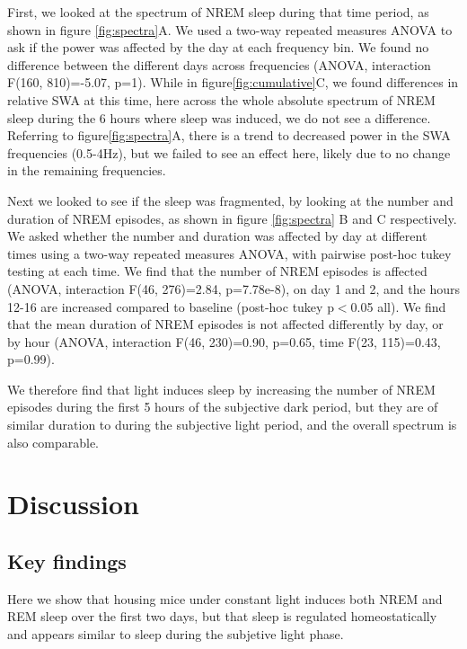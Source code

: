 First, we looked at the spectrum of NREM sleep during that time period, as
shown in figure \ref{fig:spectra}A.
We used a two-way repeated measures ANOVA to ask if the power was affected by
the day at each frequency bin.
We found no difference between the different days across frequencies (ANOVA,
interaction F(160, 810)=-5.07, p=1).
While in figure\ref{fig:cumulative}C, we found differences in relative
SWA at this time,
here across the whole absolute spectrum of NREM sleep during 
the 6 hours where sleep was induced, we do not see a difference.
Referring to figure\ref{fig:spectra}A, there is a trend to decreased
power in the SWA frequencies (0.5-4Hz), 
but we failed to see an effect here, likely due to no change in 
the remaining frequencies.

Next we looked to see if the sleep was fragmented, by looking at the number
and duration of NREM episodes, as shown in figure
\ref{fig:spectra} B and C respectively.
We asked whether the number and duration was affected by day at 
different times
using a two-way repeated measures ANOVA, with pairwise post-hoc tukey testing
at each time.
We find that the number of NREM episodes is affected (ANOVA, interaction F(46,
276)=2.84, p=7.78e-8),
on day 1 and 2, and the hours 12-16
are increased compared to baseline (post-hoc tukey p$<$0.05 all).
We find that the mean duration of NREM episodes is not affected 
differently by day, or by hour (ANOVA,
interaction F(46, 230)=0.90, p=0.65, time F(23, 115)=0.43, p=0.99).

We therefore find that light induces sleep by increasing the number 
of NREM episodes during the first 5 hours of the subjective dark period,
but they are of similar duration to during the subjective
light period, and the overall spectrum is also
comparable.



\section{Discussion}
\subsection{Key findings}
Here we show that housing mice under constant light induces 
both NREM and REM sleep over the first two days, but that sleep 
is regulated homeostatically and appears similar to sleep during the 
subjetive light phase.
